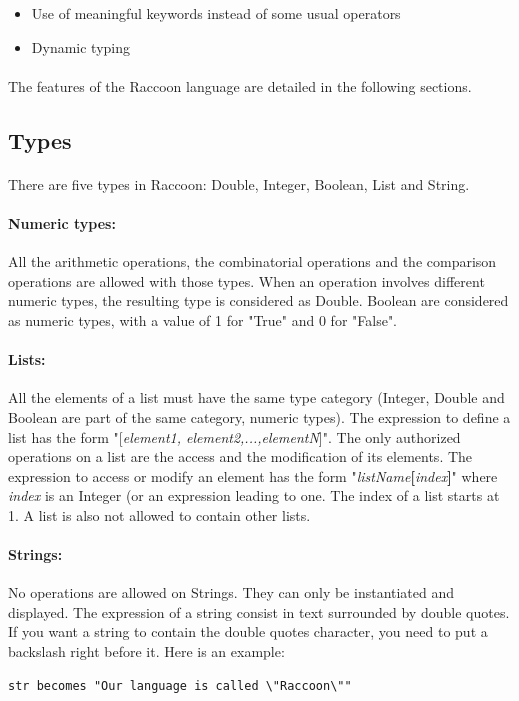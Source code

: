 \documentclass[12pt,a4paper]{article}
\begin{document}
\begin{itemize}
\item Use of meaningful keywords instead of some usual operators
\item Dynamic typing   
\end{itemize}

\paragraph{}
The features of the Raccoon language are detailed in the following sections.

\subsection{Types}
\paragraph{}
There are five types in Raccoon: Double, Integer, Boolean, List and String.

\paragraph{Numeric types:} All the arithmetic operations, the combinatorial operations and the comparison operations are allowed with those types. When an operation involves different numeric types, the resulting type is considered as Double. Boolean are considered as numeric types, with a value of 1 for "True" and 0 for "False".

\paragraph{Lists:} All the elements of a list must have the same type category (Integer, Double and Boolean are part of the same category, numeric types). The expression to define a list has the form "[\textit{element1, element2,...,elementN}]". The only authorized operations on a list are the access and the modification of its elements. The expression to access or modify an element has the form "\textit{listName}\textbf{[}\textit{index}\textbf{]}" where \textit{index} is an Integer (or an expression leading to one. The index of a list starts at 1. A list is also not allowed to contain other lists.

\paragraph{Strings:} No operations are allowed on Strings. They can only be instantiated and displayed. The expression of a string consist in text surrounded by double quotes. If you want a string to contain the double quotes character, you need to put a backslash right before it. Here is an example:
\begin{verbatim}
str becomes "Our language is called \"Raccoon\""
\end{verbatim}
\end{document}
